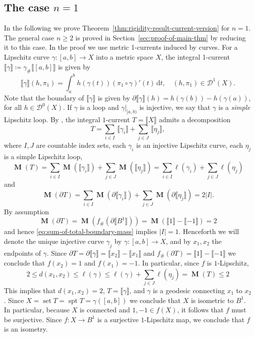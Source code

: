 \documentclass[reqno]{amsart}
\numberwithin{equation}{section}
\newcommand{\spt}{\operatorname{spt}}
\newcommand{\ud}{\mathrm {d}}
\newcommand{\bb}[1]{\llbracket #1\rrbracket}
\DeclareMathOperator{\mass}{\mathbf{M}}
\DeclareMathOperator{\set}{set}
\begin{document}
\subsection{The case \(n=1\)}\label{sec:case-n=1}
In the following we prove Theorem~\ref{thm:rigidity-result-current-version} for \(n=1\). The general case \(n\geq 2\) is proved in Section~\ref{sec:proof-of-main-thm} by reducing it to this case. In the proof we use metric 1-currents induced by curves. For a Lipschitz curve $\gamma\colon [a,b]\to X$ into a metric space $X$, the integral 1-current $\bb \gamma\coloneqq\gamma_{\#} \bb{[a,b]}$ is given by 
\[
\bb\gamma (h,\pi_1)=\int_a^b h(\gamma(t))(\pi_1\circ\gamma)'(t)\,\ud t,\quad (h,\pi_1)\in \mathcal D^1(X).
\]
Note that the boundary of $\bb\gamma$ is given by $\partial\bb\gamma(h)=h(\gamma(b))-h(\gamma(a))$, for all $h\in \mathcal D^0(X)$. If \(\gamma\) is a loop and $\gamma|_{[a,b)}$ is injective, we say that $\gamma$ is a \emph{simple} Lipschitz loop. By \cite[Theorem 5.3]{Bonicatto-Del-Nin-Pasqualetto-2022}, the integral \(1\)-current \(T=\bb{X}\) admits a decomposition
\[
T=\sum_{i\in I} \,\bb{\gamma_i}+ \sum_{j\in J}\,\bb{\eta_j},
\]
where $I, J$ are countable index sets, each \(\gamma_i\) is an injective Lipschitz curve, each $\eta_j$ is a simple Lipschitz loop,
\begin{equation}\label{eq:sum-of-total-mass}
\mass(T)=\sum_{i \in I}\mass(\bb{\gamma_i}) +\sum_{j \in J}\mass(\bb{\eta_j})=\sum_{i \in I}\ell(\gamma_i) +\sum_{j \in J}\ell(\eta_j)
\end{equation}
and
\begin{equation}\label{eq:sum-of-total-boundary-mass}
\mass(\partial T)=\sum_{i\in I} \mass(\partial\bb{\gamma_i})+\sum_{j\in J}\mass(\partial\bb{\eta_j})=2|I|.
\end{equation}
By assumption \[
\mass (\partial T)=\mass(f_\#(\partial \bb{B^1}))=\mass(\bb{1}-\bb{-1})=2
\]
and hence \eqref{eq:sum-of-total-boundary-mass} implies $|I|=1$. Henceforth we will denote the unique injective curve $\gamma_j$ by $\gamma\colon [a, b]\to X$, and by $x_1,x_2$ the endpoints of $\gamma$. Since $\partial T=\partial \bb{\gamma}=\bb{x_2}-\bb{x_1}$ 
and $f_\#(\partial T)=\bb{1}-\bb{-1}$ we conclude that $f(x_2)=1$ and $f(x_1)=-1$. In particular, since $f$ is $1$-Lipschitz,
\begin{equation}
\label{eq:length-estimate}
2\leq d(x_1,x_2)\leq \ell(\gamma)\leq \ell(\gamma)+\sum_{j\in J}\ell(\eta_j)=\mass(T)\leq 2
\end{equation}
This implies that $d(x_1,x_2)=2$, $T=\bb{\gamma}$, and $\gamma$ is a geodesic connecting $x_1$ to $x_2$. Since $X=\set T=\spt T=\gamma([a, b])$ 
we conclude that $X$ is isometric to $B^1$. In particular, because $X$ is connected and $1,-1\in f(X)$, it follows that $f$ must be surjective. Since $f\colon X\to B^1$ is a surjective $1$-Lipschitz map, 
we conclude that $f$ is an isometry. 
\end{document}
